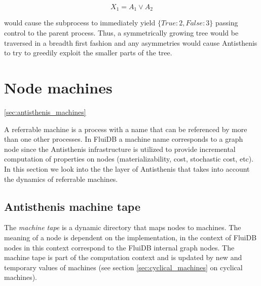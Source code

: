 \[
X_1 = A_1 \lor A_2
\]

would cause the subprocess to immediately yield
\(\{True: 2, False: 3 \}\) passing control to the parent
process. Thus, a symmetrically growing tree would be traversed in a
breadth first fashion and any asymmetries would cause Antisthenis to
try to greedily exploit the smaller parts of the tree.

\section{Node machines}
\ref{sec:antisthenis_machines}

A referrable machine is a process with a name that can be referenced
by more than one other processes. In FluiDB a machine name corresponds
to a graph node since the Antisthenis infrastructure is utilized to
provide incremental computation of properties on nodes
(materializability, cost, stochastic cost, etc). In this section we
look into the the layer of Antisthenis that takes into account the
dynamics of referrable machines.

\subsection{Antisthenis machine tape}

The \emph{machine tape} is a dynamic directory that maps nodes to
machines. The meaning of a node is dependent on the implementation, in
the context of FluiDB nodes in this context correspond to the FluiDB
internal graph nodes.  The machine tape is part of the computation
context and is updated by new and temporary values of machines (see
section \ref{sec:cyclical_machines} on cyclical machines).

